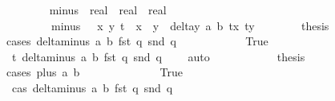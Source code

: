 \begin{isabellebody}
\ \ \ \ \ \ \isamarkupfalse%
\ {\isasymdelta}{\isacharunderscore}minus\ {\isacharcolon}{\isacharcolon}\ {\isachardoublequoteopen}real\ {\isasymRightarrow}\ real\ {\isasymRightarrow}\ real{\isachardoublequoteclose}\ \isanewline
\ \ \ \ \ \ \ \ {\isachardoublequoteopen}{\isasymdelta}{\isacharunderscore}minus\ {\isacharequal}\ {\isacharparenleft}{\isasymlambda}\ x{}\ y{}{\isachardot}\ t\ {\isacharasterisk}\ x{}\ {\isacharasterisk}\ y{}\ {\isacharasterisk}\ delta{\isacharunderscore}y\ a{}\ b{}\ {\isacharparenleft}{}{\isacharslash}{\isacharparenleft}t{\isacharasterisk}x{}{\isacharparenright}{\isacharparenright}\ {\isacharparenleft}{}{\isacharslash}{\isacharparenleft}t{\isacharasterisk}y{}{\isacharparenright}{\isacharparenright}{\isacharparenright}{\isachardoublequoteclose}\isanewline
\ \ \ \ \ \ \isamarkupfalse%
\ {\isacharquery}thesis\isanewline
\ \ \ \ \ \ \isamarkupfalse%
{\isacharparenleft}cases\ {\isachardoublequoteopen}delta{\isacharunderscore}minus\ a{}\ b{}\ {\isacharparenleft}fst\ q{\isacharparenright}\ {\isacharparenleft}snd\ q{\isacharparenright}\ {\isacharequal}\ {}{\isachardoublequoteclose}{\isacharparenright}\isanewline
\ \ \ \ \ \ \ \ \isamarkupfalse%
\ True\isanewline
\ \ \ \ \ \ \ \ \isamarkupfalse%
\ \isamarkupfalse%
\ t{}{\isacharcolon}\ {\isachardoublequoteopen}delta{\isacharunderscore}minus\ a{}\ b{}\ {\isacharparenleft}fst\ q{\isacharparenright}\ {\isacharparenleft}snd\ q{\isacharparenright}\ {\isacharequal}\ {}{\isachardoublequoteclose}\ \isamarkupfalse%
\ auto\isanewline
\ \ \ \ \ \ \ \ \isamarkupfalse%
\ \isamarkupfalse%
\ {\isacharquery}thesis\ \isanewline
\ \ \ \ \ \ \ \ \isamarkupfalse%
{\isacharparenleft}cases\ {\isachardoublequoteopen}{\isasymdelta}{\isacharunderscore}plus\ a{}\ b{}\ {\isacharequal}\ {}{\isachardoublequoteclose}{\isacharparenright}\isanewline
\ \ \ \ \ \ \ \ \ \ \isamarkupfalse%
\ True\isanewline
\ \ \ \ \ \ \ \ \ \ \isamarkupfalse%
\ \isamarkupfalse%
\ cas{}{\isacharcolon}\ {\isachardoublequoteopen}delta{\isacharunderscore}minus\ a{}\ b{}\ {\isacharparenleft}fst\ q{\isacharparenright}\ {\isacharparenleft}snd\ q{\isacharparenright}\ {\isacharequal}\ {}{\isachardoublequoteclose}\isanewline

\end{isabellebody}
